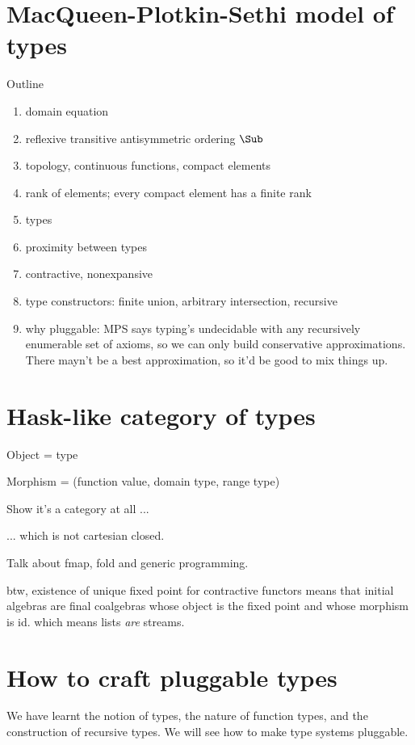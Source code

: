 \documentclass{amsart}
\begin{document}
\section{MacQueen-Plotkin-Sethi model of types}

Outline
\begin{enumerate}
\item domain equation
\item reflexive transitive antisymmetric ordering $\Sub$
\item topology, continuous functions, compact elements
\item rank of elements; every compact element has a finite rank
\item types
\item proximity between types
\item contractive, nonexpansive
\item type constructors: finite union, arbitrary intersection,
recursive
\item why pluggable: MPS says typing's undecidable with any
recursively enumerable set of axioms, so we can only build
conservative approximations. There mayn't be a best
approximation, so it'd be good to mix things up.
\end{enumerate}


\section{Hask-like category of types}

Object = type

Morphism = (function value, domain type, range type)

Show it's a category at all ...

... which is not cartesian closed.

Talk about fmap, fold and generic programming.

btw, existence of unique fixed point for contractive functors
means that initial algebras are final coalgebras whose object is
the fixed point and whose morphism is id. which means lists
\emph{are} streams.



\section{How to craft pluggable types}
\label{howto}

We have learnt the notion of types, the nature of function types,
and the construction of recursive types. We will see how to make
type systems pluggable.
\end{document}
